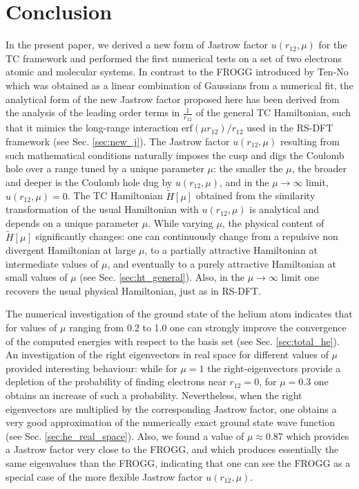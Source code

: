 \documentclass[aip,jcp,reprint,noshowkeys,superscriptaddress]{revtex4-1}
\begin{document}
\section{Conclusion}
In the present paper, we derived a new form of Jastrow factor $u(r_{12},\mu)$ for the TC framework and performed the first numerical tests on a set of two electrons atomic and molecular systems. 
In contrast to the FROGG introduced by Ten-No\cite{TenNo-CPL-00-a} which was obtained as a linear combination of Gaussians from a numerical fit, the analytical form of the new Jastrow factor proposed here has been derived from the analysis of the leading order terms in $\frac{1}{r_{12}}$ of the general TC Hamiltonian, such that it mimics the long-range interaction $\text{erf}(\mu r_{12})/r_{12}$ used in the RS-DFT framework (see Sec. \ref{sec:new_j}). 
The Jastrow factor $u(r_{12},\mu)$ resulting from such mathematical conditions naturally imposes the cusp and digs the Coulomb hole over a range tuned by a unique parameter $\mu$: the smaller the $\mu$, the broader and deeper is the Coulomb hole dug by $u(r_{12},\mu)$, and in the $\mu \rightarrow \infty$ limit, $u(r_{12},\mu)=0$. 
The TC Hamiltonian $\tilde{H}[\mu]$ obtained from the similarity transformation of the usual Hamiltonian with $u(r_{12},\mu)$ is analytical and depends on a unique parameter $\mu$. 
While varying $\mu$, the physical content of $\tilde{H}[\mu]$ significantly changes: one can continuously change from a repulsive non divergent Hamiltonian at large $\mu$, to a partially attractive Hamiltonian at intermediate values of $\mu$, and eventually to a purely attractive Hamiltonian at small values of $\mu$ (see Sec. \ref{sec:ht_general}). 
Also, in the $\mu \rightarrow \infty$ limit one recovers the usual physical Hamiltonian, just as in RS-DFT. 
 
The numerical investigation of the ground state of the helium atom indicates that for values of $\mu$ ranging from 0.2 to 1.0 one can strongly improve the convergence of the computed energies with respect to the basis set (see Sec. \ref{sec:total_he}). An investigation of the right eigenvectors in real space for different values of $\mu$ provided interesting behaviour: while for $\mu=1$ the right-eigenvectors provide a depletion of the probability of finding electrons near $r_{12}=0$, for $\mu=0.3$ one obtains an increase of such a probability. 
Nevertheless, when the right eigenvectors are multiplied by the corresponding Jastrow factor, one obtains a very good approximation of the numerically exact ground state wave function (see Sec. \ref{sec:he_real_space}).  
Also, we found a value of $\mu \approx 0.87$ which provides a Jastrow factor very close to the FROGG, and which produces essentially the same eigenvalues than the FROGG, indicating that one can see the FROGG as a special case of the more flexible Jastrow factor $u(r_{12},\mu)$. 
\end{document}
